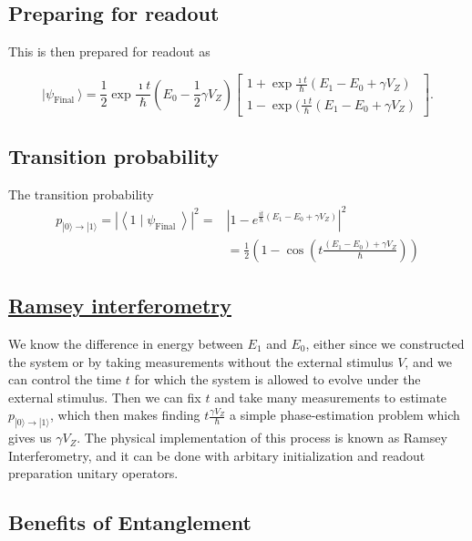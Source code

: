 \documentclass[%
oneside,                 %
final,                   %
10pt]{article}
\begin{document}
\subsection{Preparing for readout}

This is then prepared for readout as

\[
\vert\psi_{\text {Final }}\rangle=\frac{1}{2} \exp{\frac{\imath t}{\hbar}(E_{0}-\frac{1}{2} \gamma V_Z)}
\begin{bmatrix} 1+\exp{\frac{\imath t}{\hbar}(E_{1}-E_{0}+\gamma V_Z)} \\ 1-\exp{(\frac{\imath t}{\hbar}(E_{1}-E_{0}+\gamma V_Z)}\end{bmatrix}.
\]

\subsection{Transition probability}

The transition probability
\begin{align*}
p_{|0\rangle \rightarrow|1\rangle}=\left|\left\langle 1 \mid \psi_{\text {Final }}\right\rangle\right|^{2}=&\left|1-e^{\frac{i t}{\hbar}\left(E_{1}-E_{0}+\gamma V_Z\right)}\right|^{2}\\
&=\frac{1}{2}\left(1-\cos \left(t \frac{\left(E_{1}-E_{0}\right)+\gamma V_Z}{\hbar}\right)\right)
\end{align*}

\subsection{\href{{https://en.wikipedia.org/wiki/Ramsey_interferometry}}{Ramsey interferometry}}

We know the difference in energy between $E_{1}$ and $E_{0}$, either
since we constructed the system or by taking measurements without the
external stimulus $V$, and we can control the time $t$ for which the
system is allowed to evolve under the external stimulus. Then we can
fix $t$ and take many measurements to estimate $p_{|0\rangle
\rightarrow|1\rangle}$, which then makes finding $t \frac{\gamma
V_Z}{\hbar}$ a simple phase-estimation problem which gives us $\gamma
V_Z$. The physical implementation of this process is known as Ramsey
Interferometry, and it can be done with arbitary initialization and
readout preparation unitary operators.

\subsection{Benefits of Entanglement}
\end{document}
